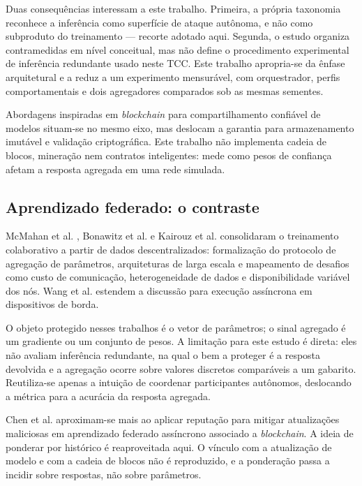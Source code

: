 \documentclass[12pt]{article}
\begin{document}
Duas consequências interessam a este trabalho. Primeira, a própria taxonomia reconhece a inferência como superfície de ataque autônoma, e não como subproduto do treinamento --- recorte adotado aqui. Segunda, o estudo organiza contramedidas em nível conceitual, mas não define o procedimento experimental de inferência redundante usado neste TCC. Este trabalho apropria-se da ênfase arquitetural e a reduz a um experimento mensurável, com orquestrador, perfis comportamentais e dois agregadores comparados sob as mesmas sementes.

Abordagens inspiradas em \textit{blockchain} para compartilhamento confiável de modelos \cite{blockchainAI2024} situam-se no mesmo eixo, mas deslocam a garantia para armazenamento imutável e validação criptográfica. Este trabalho não implementa cadeia de blocos, mineração nem contratos inteligentes: mede como pesos de confiança afetam a resposta agregada em uma rede simulada.

\subsection{Aprendizado federado: o contraste}

McMahan et al. \cite{mcmahan2017}, Bonawitz et al. \cite{bonawitz2019} e Kairouz et al. \cite{kairouz2021} consolidaram o treinamento colaborativo a partir de dados descentralizados: formalização do protocolo de agregação de parâmetros, arquiteturas de larga escala e mapeamento de desafios como custo de comunicação, heterogeneidade de dados e disponibilidade variável dos nós. Wang et al. \cite{wang2025} estendem a discussão para execução assíncrona em dispositivos de borda.

O objeto protegido nesses trabalhos é o vetor de parâmetros; o sinal agregado é um gradiente ou um conjunto de pesos. A limitação para este estudo é direta: eles não avaliam inferência redundante, na qual o bem a proteger é a resposta devolvida e a agregação ocorre sobre valores discretos comparáveis a um gabarito. Reutiliza-se apenas a intuição de coordenar participantes autônomos, deslocando a métrica para a acurácia da resposta agregada.

Chen et al. \cite{chen2024} aproximam-se mais ao aplicar reputação para mitigar atualizações maliciosas em aprendizado federado assíncrono associado a \textit{blockchain}. A ideia de ponderar por histórico é reaproveitada aqui. O vínculo com a atualização de modelo e com a cadeia de blocos não é reproduzido, e a ponderação passa a incidir sobre respostas, não sobre parâmetros.
\end{document}
